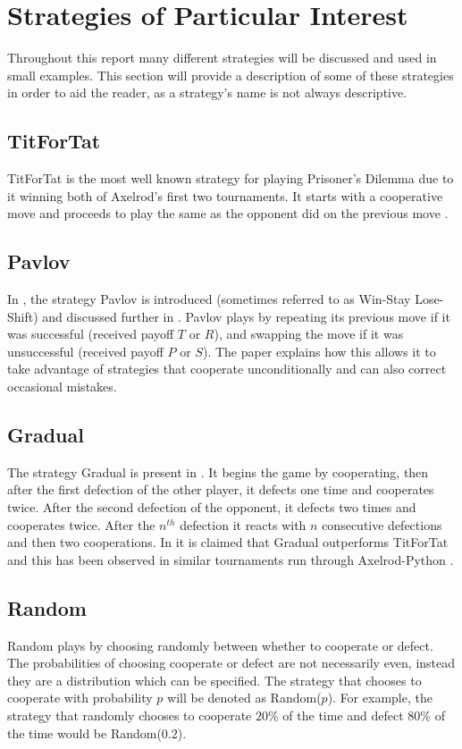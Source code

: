 \section{Strategies of Particular Interest}\label{sec:individual_strategies}
Throughout this report many different strategies will be discussed and used in small examples.
This section will provide a description of some of these strategies in order to aid the reader, as a strategy's name is not always descriptive.



\subsection{TitForTat}\label{ssec:stra_titfortat}
TitForTat is the most well known strategy for playing Prisoner's Dilemma due to it winning both of Axelrod's first two tournaments.
It starts with a cooperative move and proceeds to play the same as the opponent did on the previous move \cite{Axelrod1980b, Heap2003}.


\subsection{Pavlov}\label{ssec:strat_pavlov}
In \cite{Kraines1989}, the strategy Pavlov is introduced (sometimes referred to as Win-Stay Lose-Shift) and discussed further in \cite{Nowak1993}.
Pavlov plays by repeating its previous move if it was successful (received payoff $T$ or $R$), and swapping the move if it was unsuccessful (received payoff $P$ or $S$).
The paper explains how this allows it to take advantage of strategies that cooperate unconditionally and can also correct occasional mistakes.

\subsection{Gradual}\label{ssec:strat_gradual}
The strategy Gradual is present in \cite{Beaufils1997}.
It begins the game by cooperating, then after the first defection of the other player, it defects one time and cooperates twice.
After the second defection of the opponent, it defects two times and cooperates twice.
After the $n^{th}$ defection it reacts with $n$ consecutive defections and then two cooperations.
In \cite{Beaufils1997} it is claimed that Gradual outperforms TitForTat and this has been observed in similar tournaments run through Axelrod-Python \cite{axelrodproject}.


\subsection{Random}\label{ssec:strat_random}
Random plays  by choosing randomly between whether to cooperate or defect.
The probabilities of choosing cooperate or defect are not necessarily even, instead they are a distribution which can be specified.
The strategy that chooses to cooperate with probability $p$ will be denoted as Random($p$).
For example, the strategy that randomly chooses to cooperate $20\%$ of the time and defect $80\%$ of the time would be Random($0.2$).

